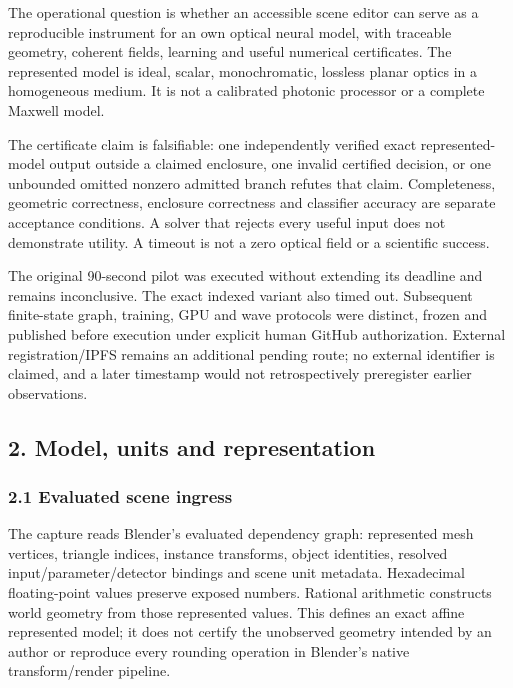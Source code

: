 \documentclass[
  10pt,
]{article}
\begin{document}
The operational question is whether an accessible scene editor can serve
as a reproducible instrument for an own optical neural model, with
traceable geometry, coherent fields, learning and useful numerical
certificates. The represented model is ideal, scalar, monochromatic,
lossless planar optics in a homogeneous medium. It is not a calibrated
photonic processor or a complete Maxwell model.

The certificate claim is falsifiable: one independently verified exact
represented-model output outside a claimed enclosure, one invalid
certified decision, or one unbounded omitted nonzero admitted branch
refutes that claim. Completeness, geometric correctness, enclosure
correctness and classifier accuracy are separate acceptance conditions.
A solver that rejects every useful input does not demonstrate utility. A
timeout is not a zero optical field or a scientific success.

The original 90-second pilot was executed without extending its deadline
and remains inconclusive. The exact indexed variant also timed out.
Subsequent finite-state graph, training, GPU and wave protocols were
distinct, frozen and published before execution under explicit human
GitHub authorization. External registration/IPFS remains an additional
pending route; no external identifier is claimed, and a later timestamp
would not retrospectively preregister earlier observations.

\hypertarget{model-units-and-representation}{%
\subsection{2. Model, units and
representation}\label{model-units-and-representation}}

\hypertarget{evaluated-scene-ingress}{%
\subsubsection{2.1 Evaluated scene
ingress}\label{evaluated-scene-ingress}}

The capture reads Blender's evaluated dependency graph: represented mesh
vertices, triangle indices, instance transforms, object identities,
resolved input/parameter/detector bindings and scene unit metadata.
Hexadecimal floating-point values preserve exposed numbers. Rational
arithmetic constructs world geometry from those represented values. This
defines an exact affine represented model; it does not certify the
unobserved geometry intended by an author or reproduce every rounding
operation in Blender's native transform/render pipeline.
\end{document}
